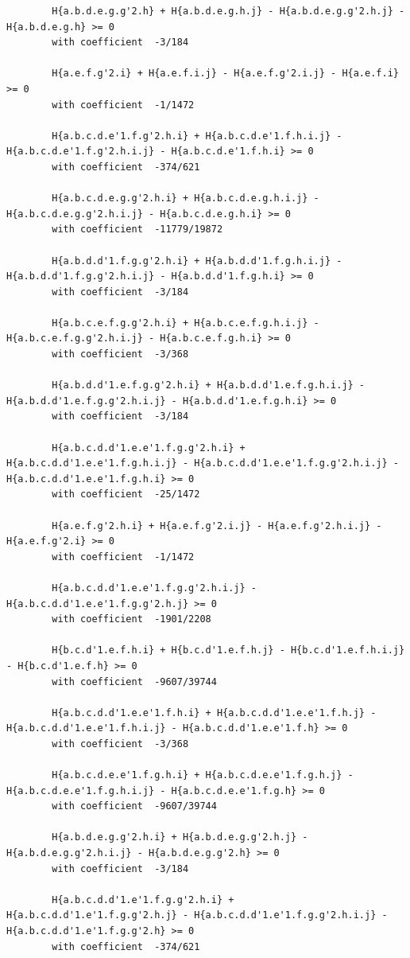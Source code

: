 \documentclass[11pt, a4paper]{kybernetika}
\begin{document}
\begin{verbatim}
		H{a.b.d.e.g.g'2.h} + H{a.b.d.e.g.h.j} - H{a.b.d.e.g.g'2.h.j} - H{a.b.d.e.g.h} >= 0
		with coefficient  -3/184
		
		H{a.e.f.g'2.i} + H{a.e.f.i.j} - H{a.e.f.g'2.i.j} - H{a.e.f.i} >= 0
		with coefficient  -1/1472
		
		H{a.b.c.d.e'1.f.g'2.h.i} + H{a.b.c.d.e'1.f.h.i.j} - H{a.b.c.d.e'1.f.g'2.h.i.j} - H{a.b.c.d.e'1.f.h.i} >= 0
		with coefficient  -374/621
		
		H{a.b.c.d.e.g.g'2.h.i} + H{a.b.c.d.e.g.h.i.j} - H{a.b.c.d.e.g.g'2.h.i.j} - H{a.b.c.d.e.g.h.i} >= 0
		with coefficient  -11779/19872
		
		H{a.b.d.d'1.f.g.g'2.h.i} + H{a.b.d.d'1.f.g.h.i.j} - H{a.b.d.d'1.f.g.g'2.h.i.j} - H{a.b.d.d'1.f.g.h.i} >= 0
		with coefficient  -3/184
		
		H{a.b.c.e.f.g.g'2.h.i} + H{a.b.c.e.f.g.h.i.j} - H{a.b.c.e.f.g.g'2.h.i.j} - H{a.b.c.e.f.g.h.i} >= 0
		with coefficient  -3/368
		
		H{a.b.d.d'1.e.f.g.g'2.h.i} + H{a.b.d.d'1.e.f.g.h.i.j} - H{a.b.d.d'1.e.f.g.g'2.h.i.j} - H{a.b.d.d'1.e.f.g.h.i} >= 0
		with coefficient  -3/184
		
		H{a.b.c.d.d'1.e.e'1.f.g.g'2.h.i} + H{a.b.c.d.d'1.e.e'1.f.g.h.i.j} - H{a.b.c.d.d'1.e.e'1.f.g.g'2.h.i.j} - H{a.b.c.d.d'1.e.e'1.f.g.h.i} >= 0
		with coefficient  -25/1472
		
		H{a.e.f.g'2.h.i} + H{a.e.f.g'2.i.j} - H{a.e.f.g'2.h.i.j} - H{a.e.f.g'2.i} >= 0
		with coefficient  -1/1472
		
		H{a.b.c.d.d'1.e.e'1.f.g.g'2.h.i.j} - H{a.b.c.d.d'1.e.e'1.f.g.g'2.h.j} >= 0
		with coefficient  -1901/2208
		
		H{b.c.d'1.e.f.h.i} + H{b.c.d'1.e.f.h.j} - H{b.c.d'1.e.f.h.i.j} - H{b.c.d'1.e.f.h} >= 0
		with coefficient  -9607/39744
		
		H{a.b.c.d.d'1.e.e'1.f.h.i} + H{a.b.c.d.d'1.e.e'1.f.h.j} - H{a.b.c.d.d'1.e.e'1.f.h.i.j} - H{a.b.c.d.d'1.e.e'1.f.h} >= 0
		with coefficient  -3/368
		
		H{a.b.c.d.e.e'1.f.g.h.i} + H{a.b.c.d.e.e'1.f.g.h.j} - H{a.b.c.d.e.e'1.f.g.h.i.j} - H{a.b.c.d.e.e'1.f.g.h} >= 0
		with coefficient  -9607/39744
		
		H{a.b.d.e.g.g'2.h.i} + H{a.b.d.e.g.g'2.h.j} - H{a.b.d.e.g.g'2.h.i.j} - H{a.b.d.e.g.g'2.h} >= 0
		with coefficient  -3/184
		
		H{a.b.c.d.d'1.e'1.f.g.g'2.h.i} + H{a.b.c.d.d'1.e'1.f.g.g'2.h.j} - H{a.b.c.d.d'1.e'1.f.g.g'2.h.i.j} - H{a.b.c.d.d'1.e'1.f.g.g'2.h} >= 0
		with coefficient  -374/621
		

\end{verbatim}
\end{document}
